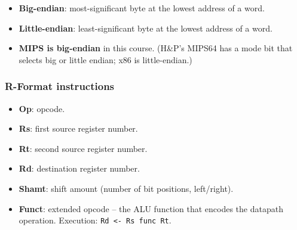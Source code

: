 \begin{definition}[Endianness]
\leavevmode
\begin{itemize}
  \item \textbf{Big-endian}: most-significant byte at the lowest address of
  a word.
  \item \textbf{Little-endian}: least-significant byte at the lowest
  address of a word.
  \item \textbf{MIPS is big-endian} in this course. (H\&P's MIPS64 has a mode bit that
  selects big or little endian; x86 is little-endian.)
\end{itemize}
\end{definition}

\subsubsection{R-Format instructions}

\begin{center}\begin{minipage}{\linewidth}\centering
{}
\end{minipage}
\end{center}

\begin{definition}
\leavevmode
\begin{itemize}
  \item \textbf{Op}: opcode.
  \item \textbf{Rs}: first source register number.
  \item \textbf{Rt}: second source register number.
  \item \textbf{Rd}: destination register number.
  \item \textbf{Shamt}: shift amount (number of bit positions, left/right).
  \item \textbf{Funct}: extended opcode -- the ALU function that encodes the
  datapath operation. Execution: \texttt{Rd <- Rs func Rt}.
\end{itemize}
\end{definition}

